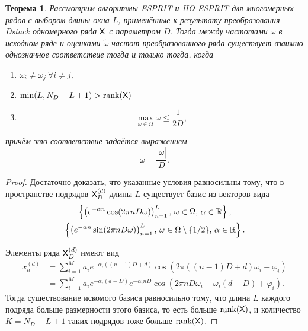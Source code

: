 \documentclass[12pt]{article}
\theoremstyle{plain}
\newtheorem{theorem}{Теорема}
\theoremstyle{definition}
\theoremstyle{remark}
\begin{document}
\begin{theorem}
  Рассмотрим алгоритмы ESPRIT и HO-ESPRIT для многомерных рядов с
  выбором длины окна $L$,
  применённые к результату преобразования Dstack одномерного ряда
  $\mathsf{X}$ с параметром $D$.
  Тогда между частотами $\omega$ в исходном ряде и оценками
  $\widetilde{\omega}$ частот преобразованного ряда существует
  взаимно однозначное соответствие тогда и только тогда, когда
  \begin{enumerate}
    \item  $\omega_i \ne \omega_j\ \forall i\ne j$,
    \item  $\min(L, N_D - L + 1) > \operatorname{rank}(\mathsf{X})$
    \item
      \begin{equation*}
        \max_{\omega \in \Omega}\omega \leqslant \frac{1}{2D},
      \end{equation*}
  \end{enumerate}
  причём это соответствие задаётся выражением
  \begin{equation*}
    \omega = \frac{|\widetilde{\omega}|}{D}.
  \end{equation*}
\end{theorem}
\begin{proof}
  Достаточно доказать, что указанные условия равносильны тому, что в
  пространстве подрядов $\mathsf{X}_D^{(d)}$ длины $L$
  существует базис из векторов вида
  \begin{gather*}
    \left\{\left(e^{-\alpha n}\cos(2\pi n
      D\omega)\right)_{n=1}^{L},\, \omega \in
    \Omega,\, \alpha \in \mathbb{R} \right\},\\
    \left\{\left(e^{-\alpha n }\sin(2\pi n
      D\omega)\right)_{n=1}^{L},\, \omega \in
    \Omega \setminus\{1/2\},\, \alpha \in \mathbb{R}\right\}.
  \end{gather*}

  Элементы ряда $\mathsf{X}_D^{(d)}$ имеют вид
  \begin{align*}
    x_n^{(d)} &= \sum_{i=1}^{M} a_i e^{-\alpha_i ((n - 1)D + d)}
    \cos(2 \pi ((n - 1)D + d) \omega_i + \varphi_i) \\
    &=\sum_{i=1}^{M} a_i e^{-\alpha_i(d - D)} e^{-\alpha_i nD }
    \cos(2 \pi nD \omega_i + \omega_i (d - D) + \varphi_i).
  \end{align*}
  Тогда существование искомого базиса равносильно тому, что длина $L$
  каждого подряда больше размерности этого базиса, то есть больше
  $\operatorname{rank}(\mathsf{X})$, и количество $K = N_D - L + 1$ таких подрядов тоже
  больше $\operatorname{rank}(\mathsf{X})$.
\end{proof}
\end{document}
